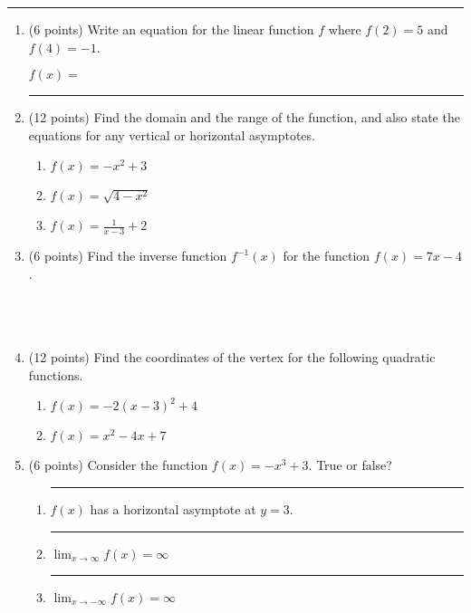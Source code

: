 \documentclass[11pt]{article}
\begin{document}
\Large

\medskip\hrule
\vspace{10pt}

\begin{enumerate}

\item (6 points) Write an equation for the linear function $f$ where $f(2) = 5$ and $f(4)=-1$.

\begin{flushright}
$f(x) =$ \rule{4cm}{0.4pt}
\end{flushright}

\item (12 points) Find the domain and the range of the function, and also state the equations for any vertical or horizontal asymptotes.
\begin{enumerate}[itemsep=30pt]
    \item $f(x) = -x^2 + 3$
    \item $f(x) = \sqrt{4-x^2}$
    \item $f(x) = \frac{1}{x-3} + 2$
\end{enumerate}
\vspace{30pt}

\item (6 points) Find the inverse function $f^{-1}(x)$ for the function $f(x) = 7x-4$. \\
\\
\\
\\

\item (12 points) Find the coordinates of the vertex for the following quadratic functions.
\begin{enumerate}[itemsep=60pt]
    \item $f(x) = -2(x-3)^2 + 4$
    \item $f(x) = x^2 - 4x + 7$ \\
\end{enumerate}
\vspace{10pt}

\newpage

\item (6 points) Consider the function $f(x) = -x^3 + 3$. True or false?
\begin{enumerate}[itemsep=20pt]
    \item \rule{1cm}{0.4pt} $f(x)$ has a horizontal asymptote at $y=3$.
    \item \rule{1cm}{0.4pt} $\displaystyle{\lim_{x \to \infty} f(x) = \infty}$
    \item \rule{1cm}{0.4pt} $\displaystyle{\lim_{x \to -\infty} f(x) = \infty}$
\end{enumerate}
\vspace{20pt}


\end{enumerate}
\end{document}
